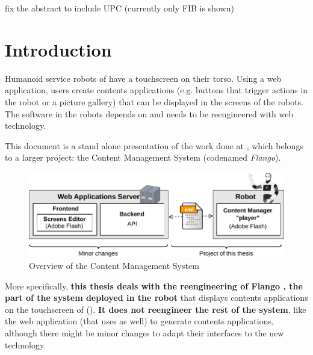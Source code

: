 
fix the abstract to include UPC (currently only FIB is shown)
\nocite{Stefanov} \nocite{Crockford} \nocite{Darwin} \nocite{AngularJSGuide} 

\chapter{Introduction}

Humanoid service robots of \company have a touchscreen on their torso.
Using a web application, users create contents applications (e.g. buttons that trigger actions in the robot or a picture gallery) that can be displayed in the screens of the robots.
The software in the robots depends on \flash and needs to be reengineered with web technology.

This document is a stand alone presentation of the work done at \company , which belongs to a larger project: the Content Management System (codenamed \textit{Flango}).
\begin{figure}[htb]
    \centering
    \includegraphics{figures/intro-system-overview.pdf}
    \caption{Overview of the Content Management System}
    \label{fig:intro-system-overview}
\end{figure}
More specifically, \textbf{this thesis deals with the reengineering of Flango \cm , the part of the system deployed \textbf{in the robot}} that displays contents applications on the touchscreen of  ().
\textbf{It does not reengineer the rest of the system}, like the web application (that uses \flash as well) to generate contents applications, although there might be minor changes to adapt their interfaces to the new technology.

